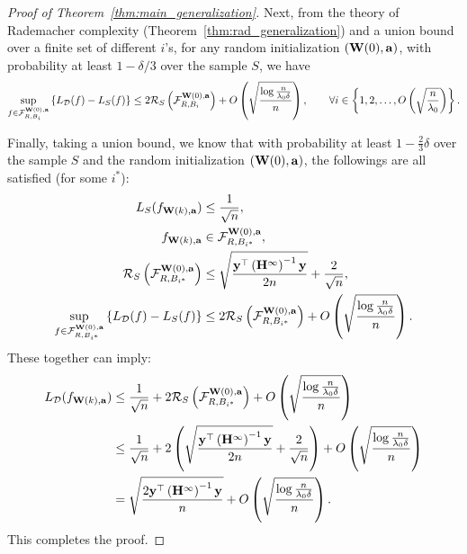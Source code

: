 \begin{proof}[Proof of Theorem~\ref{thm:main_generalization}]
 
 
 
 Next, from the theory of Rademacher complexity (Theorem~\ref{thm:rad_generalization}) and a union bound over a finite set of different $i$'s, for any random initialization $\left(\mathbf{W}(0), \mathbf{a} \right)$, with probability at least $1-\delta/3$ over the sample $S$, we have
 \begin{equation*}
 \sup_{f \in \mathcal{F}_{R, B_i}^{\mathbf{W}(0), \mathbf{a}}} \left\{ L_{\mathcal{D}}(f)-L_{S}(f) \right\} \le 2 \mathcal{R}_S\left(\mathcal{F}_{R, B_i}^{\mathbf{W}(0), \mathbf{a}}\right) + O\left( \sqrt{\frac{\log\frac{n}{\lambda_0\delta}}{n}} \right) , \qquad \forall i\in \left\{1, 2, \ldots, O\left( \sqrt{\frac{n}{\lambda_0}} \right) \right\}.
 \end{equation*}
 
 Finally, taking a union bound, we know that with probability at least $1-\frac23\delta$ over the sample $S$ and the random initialization $(\mathbf{W}(0), \mathbf{a})$, the followings are all satisfied (for some $i^*$):
 \begin{equation*}
 \begin{aligned}
 L_S(f_{\mathbf{W}(k), \mathbf{a}}) &\le \frac{1}{\sqrt n},\\
 f_{\mathbf{W}(k), \mathbf{a}} &\in \mathcal{F}_{R, B_{i^*}}^{\mathbf{W}(0), \mathbf{a}} ,\\
 \mathcal{R}_S\left( \mathcal{F}^{\mathbf{W}(0),\mathbf{a}}_{R,B_{i^*}} \right) &\le \sqrt{\frac{\mathbf{y}^\top \left(\mathbf{H}^{\infty}\right)^{-1}\mathbf{y}}{2n}}  + \frac{2}{\sqrt{n}}  , \\
  \sup_{f \in \mathcal{F}_{R, B_{i^*}}^{\mathbf{W}(0), \mathbf{a}}} \left\{ L_{\mathcal{D}}(f)-L_{S}(f) \right\} &\le 2 \mathcal{R}_S\left(\mathcal{F}_{R, B_{i^*}}^{\mathbf{W}(0), \mathbf{a}}\right) + O\left( \sqrt{\frac{\log\frac{n}{\lambda_0\delta}}{n}} \right)  .
 \end{aligned}
 \end{equation*}
 These together can imply:
 \begin{align*}
 L_{\mathcal{D}}(f_{\mathbf{W}(k), \mathbf{a}}) &\le \frac{1}{\sqrt n} + 2 \mathcal{R}_S\left(\mathcal{F}_{R, B_{i^*}}^{\mathbf{W}(0), \mathbf{a}}\right) + O\left( \sqrt{\frac{\log\frac{n}{\lambda_0\delta}}{n}} \right) \\
 &\le \frac{1}{\sqrt n} + 2 \left(\sqrt{\frac{\mathbf{y}^\top \left(\mathbf{H}^{\infty}\right)^{-1}\mathbf{y}}{2n}}  + \frac{2}{\sqrt{n}}    \right) + O\left( \sqrt{\frac{\log\frac{n}{\lambda_0\delta}}{n}} \right)  \\
  &= \sqrt{\frac{2\mathbf{y}^\top \left(\mathbf{H}^{\infty}\right)^{-1}\mathbf{y}}{n}}  + O\left( \sqrt{\frac{\log\frac{n}{\lambda_0\delta}}{n}} \right) .
 \end{align*}
 This completes the proof.
\end{proof}







